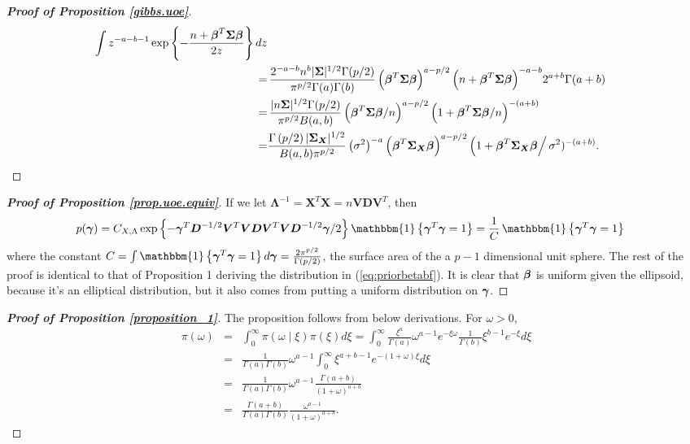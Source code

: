 \documentclass[12pt]{article}
\newcommand{\D}{{\bm  D}}
\newcommand{\V}{{\bm V}}
\newcommand{\X}{{\bm  X}}
\newcommand{\Xbf}{{\bm   X}}
\newcommand{\Lambdabf}{{\mathbf \Lambda}}
\newcommand{\Sigmabf}{{\mathbf \Sigma}}
\newcommand{\greekbold}[1]{\mbox{\boldmath $#1$}}
\newcommand{\betabf}{\greekbold{\beta}}
\newcommand{\gammabf}{\greekbold{\gamma}}
\newcommand{\ind}{\mathbbm{1}} %
\begin{document}
\begin{proof} [\textbf{Proof of Proposition \ref{gibbs.uoe}}]
\begin{align*}
\int z^{-a-b-1} \exp \left\{ -\frac{n+\betabf^T\Sigmabf\betabf}{2z} \right\} dz\\
=& \, \frac{2^{-a-b}n^b|\Sigmabf|^{1/2}\Gamma(p/2)}{\pi^{p/2}\Gamma(a)\Gamma(b)} \left( \betabf^T\Sigmabf\betabf \right)^{a-p/2}
{ \left(  n+\betabf^T\Sigmabf\betabf \right)}^{-a-b} 2^{a+b} \Gamma(a+b)\\
=& \, \frac{|n\Sigmabf|^{1/2}\Gamma(p/2)}{\pi^{p/2}B(a,b)} \left( \betabf^T\Sigmabf\betabf/n \right)^{a-p/2} { \left(  1+\betabf^T\Sigmabf\betabf/n \right)}^{-(a+b)}\\
=& \frac{\Gamma\left(p/2\right)|\Sigmabf_\X|^{1/2} }{B(a,b) \pi^{p/2}} \left(\sigma^2\right)^{-a} \left( \betabf^T \Sigmabf_\X \betabf \right)^{a-p/2} \left(1 + \betabf^T \Sigmabf_\X \betabf \right/\sigma^2)^{-(a+b)}.
\end{align*}
\end{proof}


\begin{proof} [\textbf{Proof of Proposition \ref{prop.uoe.equiv}}]
If we let $\Lambdabf^{-1} = \Xbf^T\Xbf = n\V\D\V^T$, then
\begin{align*}
p(\gammabf) &= C_{X, \Lambda} \exp\left\{ -\gammabf^T \D^{-1/2}\V^T\V\D\V^T\V \D^{-1/2} \gammabf /2 \right\} \ind\left\{ \gammabf^T\gammabf = 1 \right\} = \frac{1}{C} \, \ind\left\{ \gammabf^T\gammabf = 1 \right\}
\end{align*}
where the constant $C = \int \ind\left\{ \gammabf^T\gammabf = 1 \right\}d\gammabf = \frac{2\pi^{p/2}}{\Gamma(p/2)}$, the surface area of the a $p-1$ dimensional unit sphere.
The rest of the proof is identical to that of Proposition 1 deriving the distribution in (\ref{eq:priorbetabf}).
It is clear that $\betabf$ is uniform given the ellipsoid, because it's an elliptical distribution, but it also comes from putting a uniform distribution on $\gammabf$.
\end{proof}


\begin{proof}[ \textbf{Proof of  	Proposition \ref{proposition_1}}]
	The proposition follows from below derivations.  For $\omega>0$,
	\begin{eqnarray*}
		\pi(\omega) &=& \int_{ 0}^\infty \pi(\omega\mid\xi) \pi(\xi) d\xi = \int_{ 0}^\infty \frac{\xi^a}{\Gamma(a)} \omega^{a-1}e^{-\xi \omega}
		\frac{1}{\Gamma(b)} \xi^{b-1}e^{-\xi} d\xi \\
		&=&    \frac{1}{\Gamma(a) \Gamma(b)} \omega^{a-1} \int_{ 0}^\infty  \xi^{a+b-1} e^{-(1+\omega)\xi} d\xi \\
		&=&  \frac{1}{\Gamma(a) \Gamma(b)} \omega^{a-1} \frac{\Gamma(a+b)}{(1+\omega)^{a+b}} \\
		&=& \frac{\Gamma(a+b)}{\Gamma(a) \Gamma(b)}  \frac{\omega^{a-1}}{(1+\omega)^{a+b}} .
	\end{eqnarray*}

\end{proof}
\end{document}
